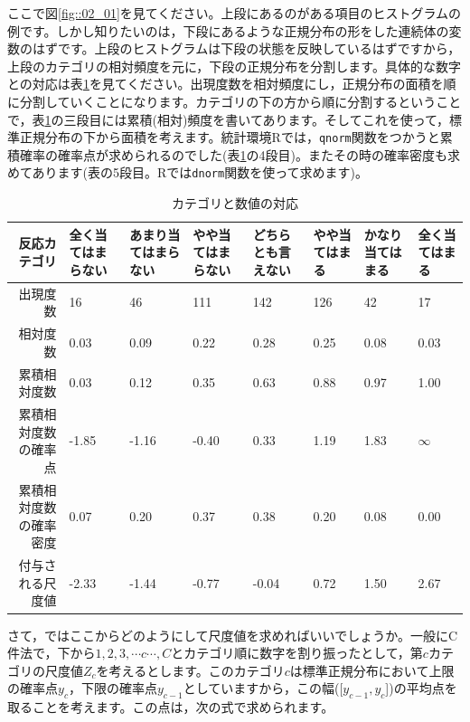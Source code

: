 \documentclass{ltjsbook}
\begin{document}
ここで図\ref{fig::02_01}を見てください。上段にあるのがある項目のヒストグラムの例です。しかし知りたいのは，下段にあるような正規分布の形をした連続体の変数のはずです。上段のヒストグラムは下段の状態を反映しているはずですから，上段のカテゴリの相対頻度を元に，下段の正規分布を分割します。具体的な数字との対応は表\ref{tbl::02_01}を見てください。出現度数を相対頻度にし，正規分布の面積を順に分割していくことになります。カテゴリの下の方から順に分割するということで，表\ref{tbl::02_01}の三段目には累積(相対)頻度を書いてあります。そしてこれを使って，標準正規分布の下から面積を考えます。統計環境Rでは，\texttt{qnorm}関数をつかうと累積確率の確率点が求められるのでした(表\ref{tbl::02_01}の4段目)。またその時の確率密度も求めてあります(表の5段目。Rでは\texttt{dnorm}関数を使って求めます)。

\begin{table}[ht]
    \centering
    \caption{カテゴリと数値の対応}
    \begin{tabular}{rp{1.5cm}p{1.5cm}p{1.5cm}p{1.5cm}p{1.5cm}p{1.5cm}p{1.5cm}}
      \hline
     反応カテゴリ& \small{全く当てはまらない} & \small{あまり当てはまらない} & \small{やや当てはまらない} & \small{どちらとも言えない} & \small{やや当てはまる} & \small{かなり当てはまる} & \small{全く当てはまる} \\ 
      \hline
   出現度数 & 16 & 46 & 111 & 142 & 126 & 42 & 17 \\ 
    相対度数 & 0.03 & 0.09 & 0.22 & 0.28 & 0.25 & 0.08 & 0.03 \\ 
    累積相対度数 & 0.03 & 0.12 & 0.35 & 0.63 & 0.88 & 0.97 & 1.00 \\ 
    累積相対度数の確率点 & -1.85 & -1.16 & -0.40 & 0.33 & 1.19 & 1.83 & $\infty$ \\ 
    累積相対度数の確率密度 & 0.07 & 0.20 & 0.37 & 0.38 & 0.20 & 0.08 & 0.00 \\ 
    付与される尺度値 & -2.33 & -1.44 & -0.77 & -0.04 & 0.72 & 1.50 & 2.67 \\ 
       \hline
    \end{tabular}
    \label{tbl::02_01}
    \end{table}

さて，ではここからどのようにして尺度値を求めればいいでしょうか。一般にC件法で，下から$1,2,3,\cdots c\cdots, C$とカテゴリ順に数字を割り振ったとして，第$c$カテゴリの尺度値$Z_c$を考えるとします。このカテゴリ$c$は標準正規分布において上限の確率点$y_c$，下限の確率点$y_{c-1}$としていますから，この幅([$y_{c-1} , y_c$])の平均点を取ることを考えます。この点は，次の式で求められます。
\end{document}
